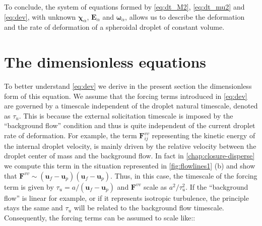 To conclude, the system of equations formed by \ref{eq:dt_M2}, \ref{eq:dt_mu2} and \ref{eq:dev}, with unknown $\bm\chi_\alpha$, $\textbf{E}_\alpha$ and $\bm\omega_\alpha$, allows us to describe the deformation and the rate of deformation of a spheroidal droplet of constant volume.

\section{The dimensionless equations}


To better understand \ref{eq:dev} we derive in the present section the dimensionless form of this equation. 
We assume that the forcing terms introduced in \ref{eq:dev} are governed by a timescale independent of the droplet natural timescale, denoted as $\tau_u$. 
This is because the external solicitation timescale is imposed by the ``background flow'' condition and thus is quite independent of the current droplet rate of deformation. 
For example, the term $\textbf{F}_{ij}^{vv}$ representing the kinetic energy of the internal droplet velocity, is mainly driven by the relative velocity between the droplet center of mass and the background flow. 
In fact in \ref{chap:closure-disperse} we compute this term in the situation represented in \ref{fig:flowlines1} (b) and show that $ \textbf{F}^{vv}\sim (\textbf{u}_f - \textbf{u}_p)(\textbf{u}_f - \textbf{u}_p)$. 
Thus, in this case, the timescale of the forcing term is given by $\tau_u = a /(\textbf{u}_f - \textbf{u}_p)$ and $\textbf{F}^{vv}$ scale as $a^2/\tau_u^2$. 
If the ``background flow'' is linear for example,  or if it represents isotropic turbulence, the principle stays the same and $\tau_u$ will be related to the background flow timescale. 
Consequently, the forcing terms can be assumed to scale like:: 

